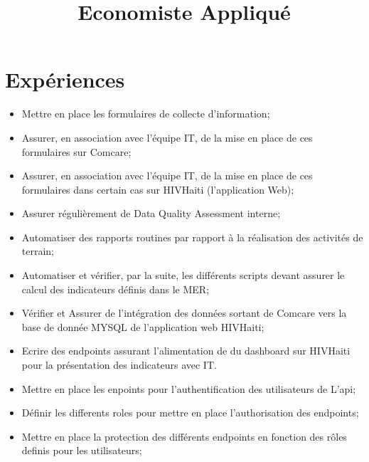 \documentclass[11pt,a4paper]{moderncv}
\title{Economiste Appliqu\'{e}}
\begin{document}
\maketitle
\section{Expériences}
{
	\begin{itemize}%
		\item Mettre en place les formulaires de collecte d'information;
		\item Assurer, en association avec l'\'{e}quipe IT, de la mise en place de ces formulaires sur Comcare;
		\item Assurer, en association avec l'\'{e}quipe IT, de la mise en place de ces formulaires dans certain cas sur HIVHaiti (l'application Web);
		\item Assurer r\'{e}guli\`{e}rement de Data Quality Assessment interne;
		\item Automatiser des rapports routines par rapport \`{a} la r\'{e}alisation des activit\'{e}s de terrain;
		\item Automatiser et v\'{e}rifier, par la suite, les diff\'{e}rents scripts devant assurer le calcul des indicateurs d\'{e}finis dans le MER;
		\item V\'{e}rifier et Assurer de l'int\'{e}gration des donn\'{e}es sortant de Comcare vers la base de donn\'{e}e MYSQL de l'application web HIVHaiti;
		\item Ecrire des endpoints assurant l'alimentation de du dashboard sur HIVHaiti pour la pr\'{e}sentation des indicateurs avec IT.
	\end{itemize}
}

{
	\begin{itemize}%
		\item  Mettre en place les enpoints pour l'authentification des utilisateurs de L'api;
		\item  D\'{e}finir les differents roles pour mettre en place l'authorisation des endpoints;
		\item  Mettre en place la protection des diff\'{e}rents endpoints en fonction des r\^{o}les definis pour les utilisateurs;
	\end{itemize}
}
\end{document}
